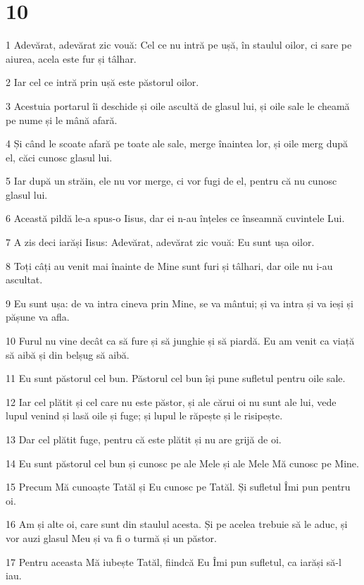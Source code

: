 \chapter{10}

\par 1 Adevărat, adevărat zic vouă: Cel ce nu intră pe ușă, în staulul oilor, ci sare pe aiurea, acela este fur și tâlhar.
\par 2 Iar cel ce intră prin ușă este păstorul oilor.
\par 3 Acestuia portarul îi deschide și oile ascultă de glasul lui, și oile sale le cheamă pe nume și le mână afară.
\par 4 Și când le scoate afară pe toate ale sale, merge înaintea lor, și oile merg după el, căci cunosc glasul lui.
\par 5 Iar după un străin, ele nu vor merge, ci vor fugi de el, pentru că nu cunosc glasul lui.
\par 6 Această pildă le-a spus-o Iisus, dar ei n-au înțeles ce înseamnă cuvintele Lui.
\par 7 A zis deci iarăși Iisus: Adevărat, adevărat zic vouă: Eu sunt ușa oilor.
\par 8 Toți câți au venit mai înainte de Mine sunt furi și tâlhari, dar oile nu i-au ascultat.
\par 9 Eu sunt ușa: de va intra cineva prin Mine, se va mântui; și va intra și va ieși și pășune va afla.
\par 10 Furul nu vine decât ca să fure și să junghie și să piardă. Eu am venit ca viață să aibă și din belșug să aibă.
\par 11 Eu sunt păstorul cel bun. Păstorul cel bun își pune sufletul pentru oile sale.
\par 12 Iar cel plătit și cel care nu este păstor, și ale cărui oi nu sunt ale lui, vede lupul venind și lasă oile și fuge; și lupul le răpește și le risipește.
\par 13 Dar cel plătit fuge, pentru că este plătit și nu are grijă de oi.
\par 14 Eu sunt păstorul cel bun și cunosc pe ale Mele și ale Mele Mă cunosc pe Mine.
\par 15 Precum Mă cunoaște Tatăl și Eu cunosc pe Tatăl. Și sufletul Îmi pun pentru oi.
\par 16 Am și alte oi, care sunt din staulul acesta. Și pe acelea trebuie să le aduc, și vor auzi glasul Meu și va fi o turmă și un păstor.
\par 17 Pentru aceasta Mă iubește Tatăl, fiindcă Eu Îmi pun sufletul, ca iarăși să-l iau.
